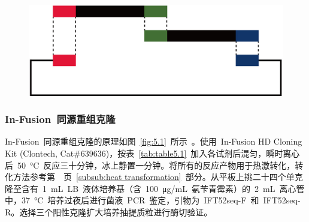 \begin{figure}[!ht]
\centering
\graphicspath{{figures/}}
\includegraphics[width=\textwidth-30mm]{fig5-1.jpg}
{
\par}
\end{figure}

\subsubsection{In-Fusion\ 同源重组克隆}\label{subsubsec:in fusion}
In-Fusion\ 同源重组克隆的原理如图\ \ref{fig:5.1}\ 所示\ \citep{Marsischky2004,Gibson2009}。使用\ In-Fusion HD Cloning Kit (Clontech, Cat\#639636)，按表\
\ref{tab:table5.1}\ 加入各试剂后混匀，瞬时离心后\ \SI{50}{\degreeCelsius}\ 反应三十分钟，冰上静置一分钟。将所有的反应产物用于热激转化，转化方法参考第\ \pageref{subsub:heat transformation}\ 页\ \ref{subsub:heat transformation}\ 部分。从平板上挑二十四个单克隆至含有\ \SI{1}{\mL}\ LB\ 液体培养基（含\ \SI{100}{\ug}/\si{\mL}\ 氨苄青霉素）的\ \SI{2}{\mL}\ 离心管中，\SI{37}{\degreeCelsius}\ 培养过夜后进行菌液\ PCR\ 鉴定，引物为\ IFT52seq-F\ 和\ IFT52seq-R。选择三个阳性克隆扩大培养抽提质粒进行酶切验证。

